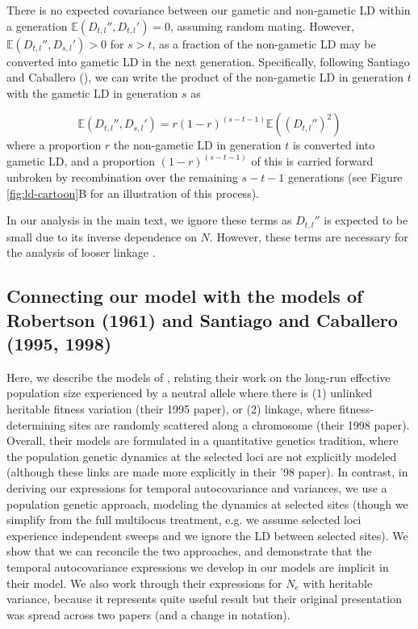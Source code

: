 \documentclass[11pt]{article}
\newcommand{\E}{\mathbb{E}}
\begin{document}
There is no expected covariance between our gametic and non-gametic LD within a
generation $\E(D_{t,l}'', D_{t,l}')=0$, assuming random mating. However,
$\E(D_{t,l}'',D_{s,l}')>0$ for $s>t$, as a fraction of the non-gametic LD
may be converted into gametic LD in the next generation. Specifically,
following Santiago and Caballero (\citeyear{Santiago1995-hx}), we can write the
product of the non-gametic LD in generation $t$ with the gametic LD in
generation $s$ as

\begin{equation}
  \E(D_{t,l}'',D_{s,l}') = r(1-r)^{(s-t-1)} \E\left((D_{t,l}'')^2\right)
  \end{equation}
%
where a proportion $r$ the non-gametic LD in generation $t$ is converted into
gametic LD, and a proportion $(1-r)^{(s-t-1)}$ of this is carried forward
unbroken by recombination over the remaining $s-t-1$ generations (see Figure
\ref{fig:ld-cartoon}B for an illustration of this process).

In our analysis in the main text, we ignore these terms as $D_{t,l}''$ is
expected to be small due to its inverse dependence on $N$. However, these terms
are necessary for the analysis of looser linkage
\parencite{Santiago1995-hx,Santiago1998-bs}. 

\subsection{Connecting our model with the models of Robertson (1961) and Santiago and Caballero (1995, 1998)}
\label{ap:connecting-sc}

Here, we describe the models of \textcite{Santiago1995-hx,Santiago1998-bs},
relating their work on the long-run effective population size experienced by a
neutral allele where there is (1) unlinked heritable fitness variation (their
1995 paper), or (2) linkage, where fitness-determining sites are randomly
scattered along a chromosome (their 1998 paper). Overall, their models are
formulated in a quantitative genetics tradition, where the population genetic
dynamics at the selected loci are not explicitly modeled (although these links
are made more explicitly in their '98 paper). In contrast, in deriving our
expressions for temporal autocovariance and variances, we use a population
genetic approach, modeling the dynamics at selected sites (though we simplify
from the full multilocus treatment, e.g. we assume selected loci experience
independent sweeps and we ignore the LD between selected sites). We show that
we can reconcile the two approaches, and demonstrate that the temporal
autocovariance expressions we develop in our models are implicit in their
model. We also work through their expressions for $N_e$ with heritable
variance, because it represents quite useful result but their original
presentation was spread across two papers (and a change in notation).
\end{document}
